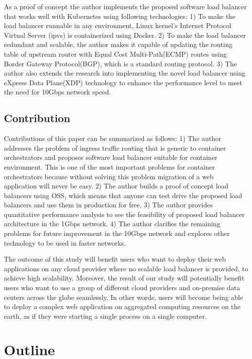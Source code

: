 As a proof of concept the author implements the proposed software load balancer that works well with Kubernetes using following technologies;
1) To make the load balancer runnable in any environment, Linux kernel's Internet Protocol Virtual Server (ipvs)\cite{Zhang2000} is containerized using Docker\cite{merkel2014docker}. 
2) To make the load balancer redundant and scalable, the author makes it capable of updating the routing table of upstream router with Equal Cost Multi-Path(ECMP) routes\cite{al2008scalable} using Border Gateway Protocol(BGP), which is a standard routing protocol.
3) The author also extends the research into implementing the novel load balancer using eXpress Data Plane(XDP) technology\cite{bertin2017xdp} to enhance the performance level to meet the need for 10Gbps network speed.

\subsection{Contribution}

Contributions of this paper can be summarized as follows:
1) The author addresses the problem of ingress traffic routing that is generic to container orchestrators and proposes software load balancer suitable for container environment.
This is one of the most important problems for container orchestrators because without solving this problem migration of a web application will never be easy.
2) The author builds a proof of concept load balancers using OSS, which means that anyone can test drive the proposed load balancers and use them in production for free.
3) The author provides quantitative performance analysis to see the feasibility of proposed load balancer architecture in the 1Gbps network.
4) The author clarifies the remaining problems for future improvement in the 10Gbps network and explores other technology to be used in faster networks.

The outcome of this study will benefit users who want to deploy their web applications on any cloud provider where no scalable load balancer is provided, to achieve high scalability.
Moreover, the result of our study will potentially benefit users who want to use a group of different cloud providers and on-premise data centers across the globe seamlessly.
In other words, users will become being able to deploy a complex web application on aggregated computing resources on the earth, as if they were starting a single process on a single computer.

\section{Outline}

